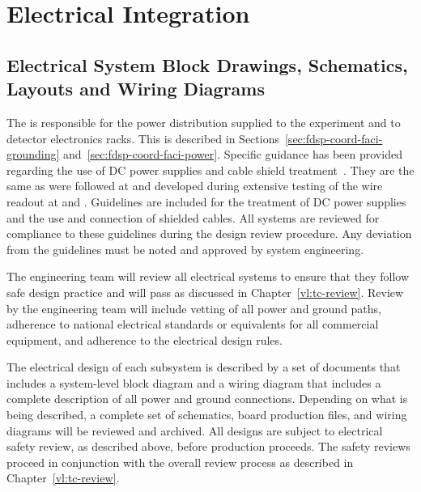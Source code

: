 

\section{Electrical Integration}
\label{sec:fdsp-Integ-electrical}


\subsection{Electrical System Block Drawings, Schematics, Layouts and Wiring Diagrams}
\label{sec:fdsp-coord-electrical}


The  is responsible for the  power distribution supplied to
the experiment and to detector electronics racks.  This is described
in Sections~\ref{sec:fdsp-coord-faci-grounding}
and~\ref{sec:fdsp-coord-faci-power}.  Specific guidance has been
provided regarding the use of DC power supplies and cable shield
treatment~\cite{bib:cernedms2095958}. 
They are the same as were
followed at  and developed during extensive testing
of the  wire readout at  and .
Guidelines are included for the treatment of DC power supplies and the
use and connection of shielded cables.  All systems are reviewed for
compliance to these guidelines during the design review procedure.
Any deviation from the guidelines must be noted and approved by system
engineering.

The  engineering team will review all electrical systems to ensure that they
follow safe design practice and will pass  as discussed in
Chapter~\ref{vl:tc-review}.  Review by the  engineering team will include vetting
of all power and ground paths, adherence to national electrical
standards or equivalents for all commercial equipment, and adherence
to the  electrical design rules.

The electrical design of each subsystem is described by a set of
documents that includes a system-level block diagram and a wiring
diagram that includes a complete description of all power and ground
connections.  Depending on what is being described, a complete set of
schematics, board production files, and wiring diagrams will be
reviewed and archived.  All designs are subject to electrical safety
review, as described above, before production proceeds. The safety
reviews proceed in conjunction with the overall review process as
described in Chapter~\ref{vl:tc-review}.

